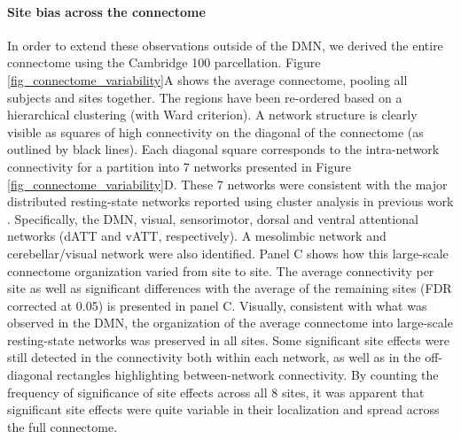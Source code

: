 \documentclass[authoryear]{elsarticle}
\begin{document}
\paragraph{Site bias across the connectome} In order to extend these observations outside of the DMN, we derived the entire connectome using the Cambridge 100 parcellation. Figure \ref{fig_connectome_variability}A shows the average connectome, pooling all subjects and sites together. The regions have been re-ordered based on a hierarchical clustering (with Ward criterion). A network structure is clearly visible as squares of high connectivity on the diagonal of the connectome (as outlined by black lines). Each diagonal square corresponds to the intra-network connectivity for a partition into 7 networks presented in Figure \ref{fig_connectome_variability}D. These 7 networks were consistent with the major distributed resting-state networks reported using cluster analysis in previous work \citep[e.g.,]{Heuvel2008, Bellec2010, Yeo2011, Power2011}. Specifically, the DMN, visual, sensorimotor, dorsal and ventral attentional networks (dATT and vATT, respectively). A mesolimbic network and cerebellar/visual network were also identified. Panel C shows how this large-scale connectome organization varied from site to site. The average connectivity per site as well as significant differences with the average of the remaining sites (FDR corrected at 0.05) is presented in panel C. Visually, consistent with what was observed in the DMN, the organization of the average connectome into large-scale resting-state networks was preserved in all sites. Some significant site effects were still detected in the connectivity both within each network, as well as in the off-diagonal rectangles highlighting between-network connectivity. By counting the frequency of significance of site effects across all 8 sites, it was apparent that significant site effects were quite variable in their localization and spread across the full connectome. 
\end{document}
